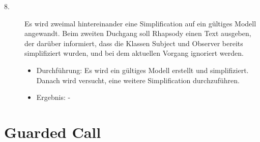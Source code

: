 \begin{description}
	\item[8.]
	Es wird zweimal hintereinander eine Simplification auf ein gültiges Modell angewandt. Beim zweiten Duchgang soll Rhapsody einen Text ausgeben, der darüber informiert, dass die Klassen Subject und Observer bereits simplifiziert wurden, und bei dem aktuellen Vorgang ignoriert werden.
	\begin{itemize}
  		\item{Durchführung:}
			Es wird ein gültiges Modell erstellt und simplifiziert. Danach wird versucht,
			eine weitere Simplification durchzuführen.
  		\item{Ergebnis:}
			-
  	\end{itemize} 
\end{description}


\section{Guarded Call}

